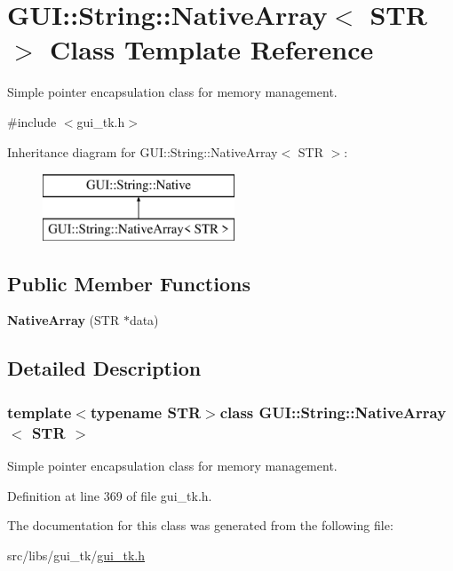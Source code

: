 \hypertarget{classGUI_1_1String_1_1NativeArray}{\section{G\-U\-I\-:\-:String\-:\-:Native\-Array$<$ S\-T\-R $>$ Class Template Reference}
\label{classGUI_1_1String_1_1NativeArray}
}


Simple pointer encapsulation class for memory management.  




{\ttfamily \#include $<$gui\-\_\-tk.\-h$>$}

Inheritance diagram for G\-U\-I\-:\-:String\-:\-:Native\-Array$<$ S\-T\-R $>$\-:\begin{figure}[H]
\begin{center}
\leavevmode
\includegraphics[height=2.000000cm]{classGUI_1_1String_1_1NativeArray}
\end{center}
\end{figure}
\subsection*{Public Member Functions}
\begin{DoxyCompactItemize}
\item 
\hypertarget{classGUI_1_1String_1_1NativeArray_ab2d403d8dcd599e11aeb76ded3106b7a}{{\bfseries Native\-Array} (S\-T\-R $\ast$data)}\label{classGUI_1_1String_1_1NativeArray_ab2d403d8dcd599e11aeb76ded3106b7a}

\end{DoxyCompactItemize}


\subsection{Detailed Description}
\subsubsection*{template$<$typename S\-T\-R$>$class G\-U\-I\-::\-String\-::\-Native\-Array$<$ S\-T\-R $>$}

Simple pointer encapsulation class for memory management. 

Definition at line 369 of file gui\-\_\-tk.\-h.



The documentation for this class was generated from the following file\-:\begin{DoxyCompactItemize}
\item 
src/libs/gui\-\_\-tk/\hyperlink{gui__tk_8h}{gui\-\_\-tk.\-h}\end{DoxyCompactItemize}
